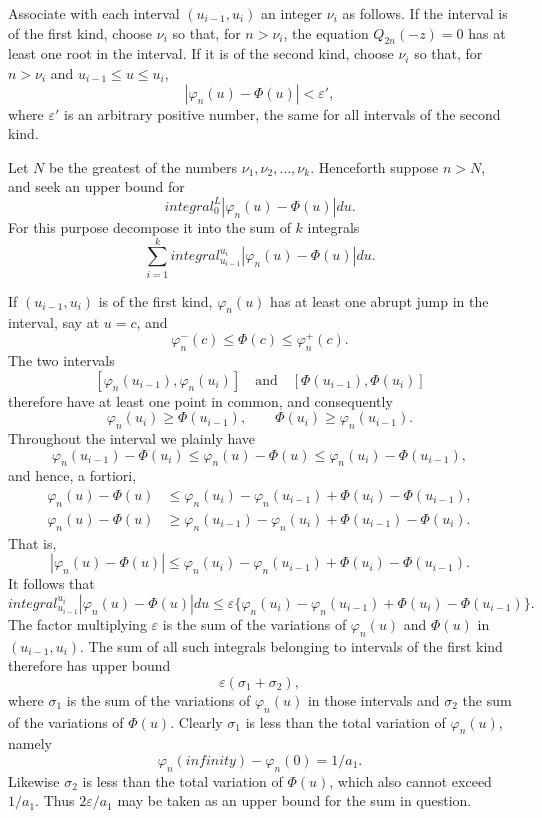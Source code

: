 \documentclass[
  paper=b5,
  fontsize=13pt,
  twoside,
  headings=normal,
  bookmarkpackage=false
]{scrartcl}
\theoremstyle{stieltjesplain}
\theoremstyle{stieltjesdefinition}
\def\int{integral}%
\def\frac#1#2{#1/#2}%
\def\infty{infinity}%
\def\,{ }%
\begin{document}
Associate with each interval $(u_{i-1},u_i)$ an integer $\nu_i$ as follows. If the interval is of the first kind, choose $\nu_i$ so that, for $n>\nu_i$, the equation $Q_{2n}(-z)=0$ has at least one root in the interval. If it is of the second kind, choose $\nu_i$ so that, for $n>\nu_i$ and $u_{i-1}\leq u\leq u_i$,
\[
 |\varphi_n(u)-\Phi(u)|<\varepsilon',
\]
where $\varepsilon'$ is an arbitrary positive number, the same for all intervals of the second kind.

Let $N$ be the greatest of the numbers $\nu_1,\nu_2,\ldots,\nu_k$. Henceforth suppose $n>N$, and seek an upper bound for
\[
 \int_0^L|\varphi_n(u)-\Phi(u)|\,du.
\]
For this purpose decompose it into the sum of $k$ integrals
\[
 \sum_{i=1}^k\int_{u_{i-1}}^{u_i}|\varphi_n(u)-\Phi(u)|\,du.
\]

If $(u_{i-1},u_i)$ is of the first kind, $\varphi_n(u)$ has at least one abrupt jump in the interval, say at $u=c$, and
\[
 \varphi_n^{-}(c)\leq\Phi(c)\leq\varphi_n^{+}(c).
\]
The two intervals
\[
 [\varphi_n(u_{i-1}),\varphi_n(u_i)]
 \quad\text{and}\quad
 [\Phi(u_{i-1}),\Phi(u_i)]
\]
therefore have at least one point in common, and consequently
\[
 \varphi_n(u_i)\geq\Phi(u_{i-1}),
 \qquad
 \Phi(u_i)\geq\varphi_n(u_{i-1}).
\]
Throughout the interval we plainly have
\[
 \varphi_n(u_{i-1})-\Phi(u_i)
 \leq\varphi_n(u)-\Phi(u)
 \leq\varphi_n(u_i)-\Phi(u_{i-1}),
\]
and hence, a fortiori,
\begin{align*}
 \varphi_n(u)-\Phi(u)
 &\leq\varphi_n(u_i)-\varphi_n(u_{i-1})
       +\Phi(u_i)-\Phi(u_{i-1}),\\
 \varphi_n(u)-\Phi(u)
 &\geq\varphi_n(u_{i-1})-\varphi_n(u_i)
       +\Phi(u_{i-1})-\Phi(u_i).
\end{align*}
That is,
\[
 |\varphi_n(u)-\Phi(u)|
 \leq\varphi_n(u_i)-\varphi_n(u_{i-1})
      +\Phi(u_i)-\Phi(u_{i-1}).
\]
It follows that
\[
 \int_{u_{i-1}}^{u_i}|\varphi_n(u)-\Phi(u)|\,du
 \leq\varepsilon\{\varphi_n(u_i)-\varphi_n(u_{i-1})
       +\Phi(u_i)-\Phi(u_{i-1})\}.
\]
The factor multiplying $\varepsilon$ is the sum of the variations of $\varphi_n(u)$ and $\Phi(u)$ in $(u_{i-1},u_i)$. The sum of all such integrals belonging to intervals of the first kind therefore has upper bound
\[
 \varepsilon(\sigma_1+\sigma_2),
\]
where $\sigma_1$ is the sum of the variations of $\varphi_n(u)$ in those intervals and $\sigma_2$ the sum of the variations of $\Phi(u)$. Clearly $\sigma_1$ is less than the total variation
of $\varphi_n(u)$, namely
\[
 \varphi_n(\infty)-\varphi_n(0)=\frac1{a_1}.
\]
Likewise $\sigma_2$ is less than the total variation of $\Phi(u)$, which also cannot exceed $1/a_1$. Thus $2\varepsilon/a_1$ may be taken as an upper bound for the sum in question.
\end{document}
